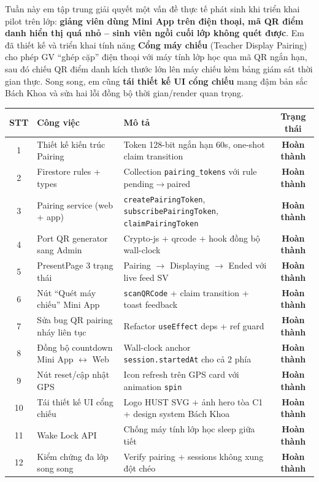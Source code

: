 \documentclass{article}
\begin{document}
Tuần này em tập trung giải quyết một vấn đề thực tế phát sinh khi triển khai pilot trên lớp: \textbf{giảng viên dùng Mini App trên điện thoại, mã QR điểm danh hiển thị quá nhỏ -- sinh viên ngồi cuối lớp không quét được}. Em đã thiết kế và triển khai tính năng \textbf{Cổng máy chiếu} (Teacher Display Pairing) cho phép GV ``ghép cặp'' điện thoại với máy tính lớp học qua mã QR ngắn hạn, sau đó chiếu QR điểm danh kích thước lớn lên máy chiếu kèm bảng giám sát thời gian thực. Song song, em cũng \textbf{tái thiết kế UI cổng chiếu} mang đậm bản sắc Bách Khoa và sửa hai lỗi đồng bộ thời gian/render quan trọng.

\begin{center}
\begin{tabularx}{\textwidth}{@{}c l X c@{}}
\toprule
\textbf{STT} & \textbf{Công việc} & \textbf{Mô tả} & \textbf{Trạng thái} \\
\midrule
1 & Thiết kế kiến trúc Pairing & Token 128-bit ngắn hạn 60s, one-shot claim transition & \textcolor{statusgreen}{\textbf{Hoàn thành}} \\
2 & Firestore rules + types & Collection \texttt{pairing\_tokens} với rule pending$\to$paired & \textcolor{statusgreen}{\textbf{Hoàn thành}} \\
3 & Pairing service (web + app) & \texttt{createPairingToken}, \texttt{subscribePairingToken}, \texttt{claimPairingToken} & \textcolor{statusgreen}{\textbf{Hoàn thành}} \\
4 & Port QR generator sang Admin & Crypto-js + qrcode + hook đồng bộ wall-clock & \textcolor{statusgreen}{\textbf{Hoàn thành}} \\
5 & PresentPage 3 trạng thái & Pairing $\to$ Displaying $\to$ Ended với live feed SV & \textcolor{statusgreen}{\textbf{Hoàn thành}} \\
6 & Nút ``Quét máy chiếu'' Mini App & \texttt{scanQRCode} + claim transition + toast feedback & \textcolor{statusgreen}{\textbf{Hoàn thành}} \\
7 & Sửa bug QR pairing nháy liên tục & Refactor \texttt{useEffect} deps + ref guard & \textcolor{statusgreen}{\textbf{Hoàn thành}} \\
8 & Đồng bộ countdown Mini App $\leftrightarrow$ Web & Wall-clock anchor \texttt{session.startedAt} cho cả 2 phía & \textcolor{statusgreen}{\textbf{Hoàn thành}} \\
9 & Nút reset/cập nhật GPS & Icon refresh trên GPS card với animation \texttt{spin} & \textcolor{statusgreen}{\textbf{Hoàn thành}} \\
10 & Tái thiết kế UI cổng chiếu & Logo HUST SVG + ảnh hero tòa C1 + design system Bách Khoa & \textcolor{statusgreen}{\textbf{Hoàn thành}} \\
11 & Wake Lock API & Chống máy tính lớp học sleep giữa tiết & \textcolor{statusgreen}{\textbf{Hoàn thành}} \\
12 & Kiểm chứng đa lớp song song & Verify pairing + sessions không xung đột chéo & \textcolor{statusgreen}{\textbf{Hoàn thành}} \\
\bottomrule
\end{tabularx}
\end{center}
\end{document}
